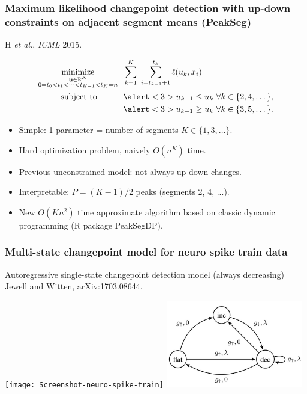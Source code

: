 \documentclass{beamer}
\DeclareMathOperator*{\minimize}{minimize}
\newcommand{\RR}{\mathbb R}
\begin{document}
\begin{frame}
  \frametitle{Maximum likelihood changepoint detection with up-down constraints on adjacent segment means (PeakSeg)}
H {\it et al.}, {\it ICML} 2015. 
   
\vskip -1.5cm
\begin{align*}
    \minimize_{\substack{
  \mathbf u\in\RR^{K}
\\
   0=t_0<t_1<\cdots<t_{K-1}<t_K=n
  }} &\ \ 
    \sum_{k=1}^K\  \sum_{i=t_{k-1}+1}^{t_k} \ell( u_k,  x_i) 
  \label{PeakSegPDPA}
\\
      \text{subject to \hskip 0.75cm} &\ \ \alert<3>{u_{k-1} \leq u_k\ \forall k\in\{2,4,\dots\},}
  \nonumber\\
  &\ \ \alert<3>{u_{k-1} \geq u_k\ \forall k\in\{3,5,\dots\}.}
  \nonumber 
\end{align*}
\vskip -0.4cm
\begin{itemize}  
\item Simple: 1 parameter = number of segments $K\in\{1,3,\dots\}$.
\item Hard optimization problem, naively $O(n^K)$ time.
\item \alert<2>{Previous unconstrained model: not always up-down changes.}
\item \alert<3>{Interpretable: $P=(K-1)/2$ peaks (segments 2, 4, ...).}
\item New $O(Kn^2)$ time approximate algorithm based on classic
  dynamic programming (R package PeakSegDP).
\end{itemize}
\end{frame} 

\begin{frame}
  \frametitle{Multi-state changepoint model for neuro spike train
    data}
  Autoregressive single-state changepoint detection model (always
  decreasing) Jewell and Witten, arXiv:1703.08644.

  \texttt{[image: Screenshot-neuro-spike-train]}
  \includegraphics[width=0.45\textwidth]{Screenshot-three-states}
\end{frame}
\end{document}

